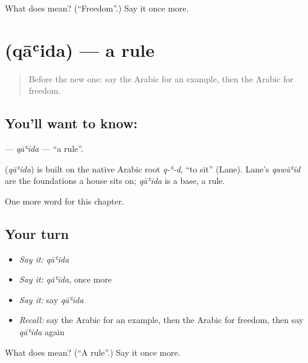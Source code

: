 \begin{tcolorbox}[breakable,colback=teal!4,colframe=teal!35!black,title={Before you move on}]
What does  mean? (\textquotedblleft{}Freedom\textquotedblright{}.) Say it once more.
\end{tcolorbox}
\section[\texorpdfstring{\ar{قاعدة} (qāʿida)}{قاعدة (qāʿida)}]{ (qāʿida) — a rule}

\label{lesson:AR-C208-qaida}



\begin{quote}
Before the new one: say the Arabic for an example, then the Arabic for freedom.
\end{quote}

\subsection*{You'll want to know: }
\textbf{} — \emph{qāʿida} — \textquotedblleft{}a rule\textquotedblright{}.

\begin{cousinweb}
\textbf{} (\emph{qāʿida}) is built on the native Arabic root \emph{q-ʿ-d}, \textquotedblleft{}to sit\textquotedblright{} (Lane). Lane's \emph{qawāʿid} are the foundations a house sits on; \emph{qāʿida} is a base, a rule.
\end{cousinweb}

\begin{grammarlens}[title={What you've built}]
One more word for this chapter.
\end{grammarlens}

\subsection*{Your turn}
\begin{itemize}
\raggedright
  \item \emph{Say it:} \emph{qāʿida}
  \item \emph{Say it:} \emph{qāʿida}, once more
  \item \emph{Say it:} say \emph{qāʿida}
  \item \emph{Recall:} say the Arabic for an example, then the Arabic for freedom, then say \emph{qāʿida} again
\end{itemize}

\begin{tcolorbox}[breakable,colback=teal!4,colframe=teal!35!black,title={Before you move on}]
What does  mean? (\textquotedblleft{}A rule\textquotedblright{}.) Say it once more.
\end{tcolorbox}
